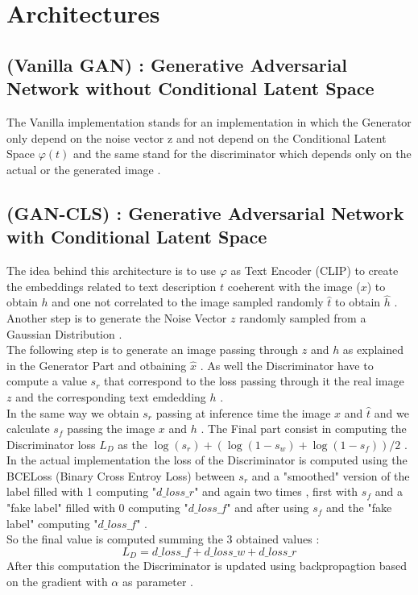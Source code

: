 
\section*{Architectures}

\subsection*{(Vanilla GAN) :  Generative Adversarial Network without Conditional Latent Space }
The Vanilla implementation stands for an implementation in which the Generator only depend 
on the noise vector z and not depend on the Conditional Latent Space $ \varphi(t) $ and the same 
stand for the discriminator which depends only on the actual or the generated image .

\subsection*{(GAN-CLS) :  Generative Adversarial Network with Conditional Latent Space }
The idea behind this architecture is to use $\varphi$ as Text Encoder (CLIP)
to create the embeddings related to text description ${t}$ coeherent with the image (${x}$) 
to obtain ${h}$ and one not correlated to the image sampled randomly $\hat{t}$ to obtain $\hat{h}$ .
Another step is to generate the Noise Vector ${z}$ randomly sampled from a Gaussian 
Distribution . \\
The following step is to generate an image passing through ${z}$ and ${h}$ as explained 
in the Generator Part and otbaining $\hat{x}$ .
As well the Discriminator have to compute a value ${s_r}$ that correspond to 
the loss passing through it the real image ${z}$ and the corresponding text 
emdedding ${h}$ . \\
In the same way we obtain ${s_r}$ passing at inference time 
the image ${x}$ and $\hat{t}$ and we calculate 
${s_f}$ passing the image ${x}$ and ${h}$ . 
The Final part consist in computing the Discriminator loss $L_D$ as the 
$\log(s_r) + \left(\log(1 - s_w) + \log(1 - s_f)\right) / 2$ . \\
In the actual implementation the loss of the Discriminator is computed 
using the BCELoss (Binary Cross Entroy Loss) between ${s_r}$ and a 
"smoothed" version of the label filled with 1 computing "${d\_loss\_r}$" and again two times , first 
with ${s_f}$ and a "fake label" filled with 0 computing "${d\_loss\_f}$" and after using 
${s_f}$ and the "fake label" computing "${d\_loss\_f}$" . \\
So the final value is computed summing the 3 obtained values :
\[
 L_D = d\_loss\_f + d\_loss\_w + d\_loss\_r
\]
After this computation the Discriminator is updated using backpropagtion 
based on the gradient with $\alpha$ as parameter .

